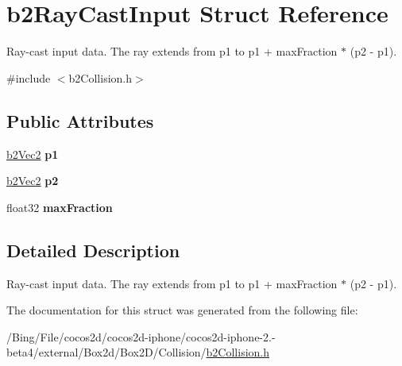 \hypertarget{structb2_ray_cast_input}{\section{b2\-Ray\-Cast\-Input Struct Reference}
\label{structb2_ray_cast_input}
}


Ray-\/cast input data. The ray extends from p1 to p1 + max\-Fraction $\ast$ (p2 -\/ p1).  




{\ttfamily \#include $<$b2\-Collision.\-h$>$}

\subsection*{Public Attributes}
\begin{DoxyCompactItemize}
\item 
\hypertarget{structb2_ray_cast_input_a7254a7062422833b1124fa464ab4caf3}{\hyperlink{structb2_vec2}{b2\-Vec2} {\bfseries p1}}\label{structb2_ray_cast_input_a7254a7062422833b1124fa464ab4caf3}

\item 
\hypertarget{structb2_ray_cast_input_a850102c843469781a3a627c871043d0b}{\hyperlink{structb2_vec2}{b2\-Vec2} {\bfseries p2}}\label{structb2_ray_cast_input_a850102c843469781a3a627c871043d0b}

\item 
\hypertarget{structb2_ray_cast_input_acb5c88e0ef2c3716a1334611522ab0b2}{float32 {\bfseries max\-Fraction}}\label{structb2_ray_cast_input_acb5c88e0ef2c3716a1334611522ab0b2}

\end{DoxyCompactItemize}


\subsection{Detailed Description}
Ray-\/cast input data. The ray extends from p1 to p1 + max\-Fraction $\ast$ (p2 -\/ p1). 

The documentation for this struct was generated from the following file\-:\begin{DoxyCompactItemize}
\item 
/\-Bing/\-File/cocos2d/cocos2d-\/iphone/cocos2d-\/iphone-\/2.-\/beta4/external/\-Box2d/\-Box2\-D/\-Collision/\hyperlink{b2_collision_8h}{b2\-Collision.\-h}\end{DoxyCompactItemize}
